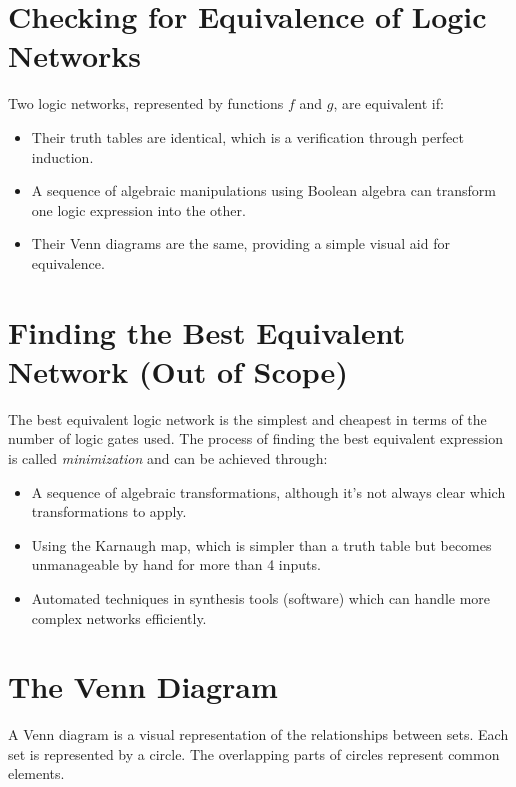 \documentclass[12pt,openany]{book}
\begin{document}
			      	\newpage
			      	\section*{Checking for Equivalence of Logic Networks}
			      	
			      	Two logic networks, represented by functions \( f \) and \( g \), are equivalent if:
			      	\begin{itemize}
			      		\item[] Their truth tables are identical, which is a verification through perfect induction.
			      		\item[] A sequence of algebraic manipulations using Boolean algebra can transform one logic expression into the other.
			      		\item[] Their Venn diagrams are the same, providing a simple visual aid for equivalence.
			      	\end{itemize}
			      	  
			      	\section*{Finding the Best Equivalent Network (Out of Scope)}
			      	  
			      	The best equivalent logic network is the simplest and cheapest in terms of the number of logic gates used. The process of finding the best equivalent expression is called \emph{minimization} and can be achieved through:
			      	\begin{itemize}
			      		\item[] A sequence of algebraic transformations, although it's not always clear which transformations to apply.
			      		\item[] Using the Karnaugh map, which is simpler than a truth table but becomes unmanageable by hand for more than 4 inputs.
			      		\item[] Automated techniques in synthesis tools (software) which can handle more complex networks efficiently.
			      	\end{itemize}
			      	  
			      	\section{The Venn Diagram}
			      	A Venn diagram is a visual representation of the relationships between sets. Each set is represented by a circle. The overlapping parts of circles represent common elements.
			      	
\end{document}
